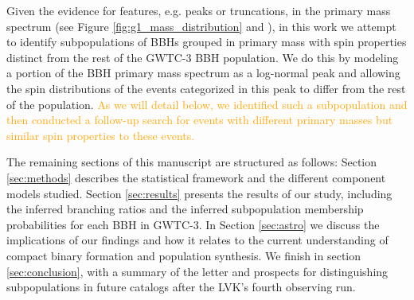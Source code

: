 Given the evidence for features, e.g. peaks or truncations, in the primary mass spectrum (see Figure \ref{fig:g1_mass_distribution} and \citet{10.3847/2041-8213/aa9bf6, 10.3847/1538-4357/aab34c, 2019ApJ...882L..24A, 2021ApJ...913L...7A, 2021arXiv211103634T, 2022ApJ...928..155T, 2301.00834}), in this work we attempt to identify subpopulations of BBHs grouped in primary mass with spin properties distinct from the rest of the GWTC-3 BBH population. We do this by modeling a portion of the BBH primary mass spectrum as a log-normal peak and allowing the spin distributions of the events categorized in this peak to differ from the rest of the population.  \textcolor{orange}{As we will detail below, we identified such a subpopulation and then conducted a follow-up search for events with different primary masses but similar spin properties to these events.}

The remaining sections of this manuscript are structured as follows: Section \ref{sec:methods} describes the statistical framework and the different component models studied. Section \ref{sec:results} presents the results of our study, including the inferred branching ratios and the inferred subpopulation membership probabilities for each BBH in GWTC-3. In Section \ref{sec:astro} we discuss the implications of our findings and how it relates to the current understanding of compact binary formation and population synthesis. We finish in section \ref{sec:conclusion}, with a summary of the letter and prospects for distinguishing subpopulations in future catalogs after the LVK's fourth observing run.